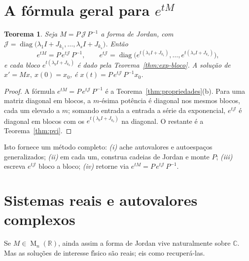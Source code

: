 \documentclass[11pt,a4paper]{amsart}
\newcommand{\R}{\mathbb{R}}
\newcommand{\C}{\mathbb{C}}
\DeclareMathOperator{\diag}{diag}
\DeclareMathOperator{\Mat}{M}
\theoremstyle{plain}
\newtheorem{teorema}{Teorema}[section]
\theoremstyle{definition}
\theoremstyle{remark}
\begin{document}
\section{A f\'ormula geral para $e^{tM}$}
\label{sec:geral}

\begin{teorema}\label{thm:geral}
Seja $M=P\,\mathcal{J}\,P^{-1}$ a forma de Jordan, com
$\mathcal{J}=\diag\big(\lambda_1 I + J_{k_1},\dots,\lambda_s I + J_{k_s}\big)$.
Ent\~ao
\[
  e^{tM} = P\,e^{t\mathcal{J}}\,P^{-1},
  \qquad
  e^{t\mathcal{J}} = \diag\!\Big(e^{t(\lambda_1 I + J_{k_1})},\dots,
  e^{t(\lambda_s I + J_{k_s})}\Big),
\]
e cada bloco $e^{t(\lambda_b I + J_{k_b})}$ \'e dado pela
Teorema~\ref{thm:exp-bloco}. A solu\c{c}\~ao de $x'=Mx,\ x(0)=x_0$, \'e
$x(t)=P\,e^{t\mathcal{J}}\,P^{-1}x_0$.
\end{teorema}

\begin{proof}
A f\'ormula $e^{tM}=P\,e^{t\mathcal{J}}\,P^{-1}$ \'e a
Teorema~\ref{thm:propriedades}(b). Para uma matriz diagonal em blocos, a
$m$-\'esima pot\^encia \'e diagonal nos mesmos blocos, cada um elevado a $m$;
somando entrada a entrada a s\'erie da exponencial, $e^{t\mathcal{J}}$ \'e
diagonal em blocos com os $e^{t(\lambda_b I + J_{k_b})}$ na diagonal. O restante
\'e a Teorema~\ref{thm:pvi}.
\end{proof}

Isto fornece um m\'etodo completo: \emph{(i)} ache autovalores e autoespa\c{c}os
generalizados; \emph{(ii)} em cada um, construa cadeias de Jordan e monte $P$;
\emph{(iii)} escreva $e^{t\mathcal{J}}$ bloco a bloco; \emph{(iv)} retorne via
$e^{tM}=P\,e^{t\mathcal{J}}\,P^{-1}$.

\section{Sistemas reais e autovalores complexos}
\label{sec:real}

Se $M\in\Mat_n(\R)$, ainda assim a forma de Jordan vive naturalmente sobre
$\C$. Mas as solu\c{c}\~oes de interesse f\'\i sico s\~ao reais; eis como
recuper\'a-las.
\end{document}
